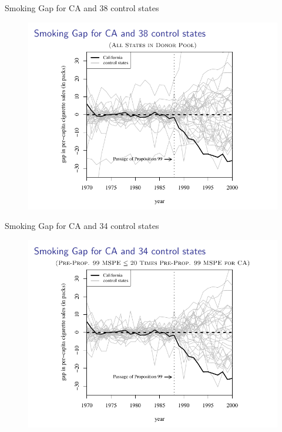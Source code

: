 \documentclass{beamer}
\begin{document}
\begin{frame}{Smoking Gap for CA and 38 control states}
	
	\begin{figure}
	\includegraphics[scale=0.75]{./lecture_includes/abadie_7.pdf}
	\end{figure}
\end{frame}

\begin{frame}{Smoking Gap for CA and 34 control states}
	
	\begin{figure}
	\includegraphics[scale=0.75]{./lecture_includes/abadie_8.pdf}
	\end{figure}
\end{frame}
\end{document}
